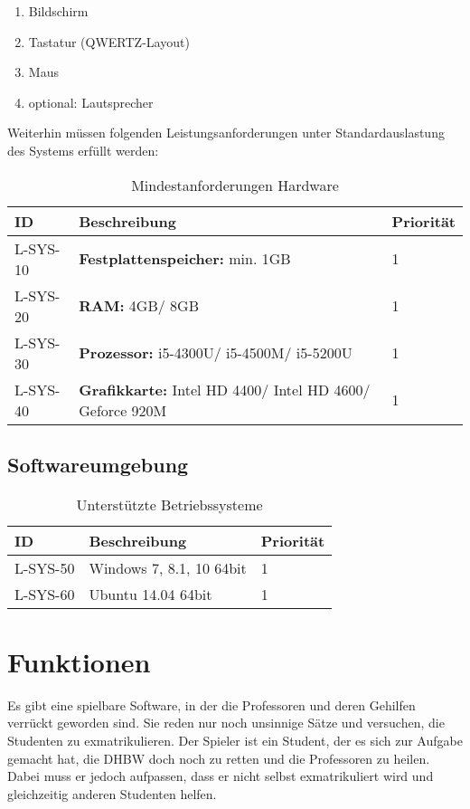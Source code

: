 \begin{enumerate}
	\item Bildschirm
	\item Tastatur (QWERTZ-Layout)
	\item Maus
	\item optional: Lautsprecher
\end{enumerate}

Weiterhin müssen folgenden Leistungsanforderungen unter Standardauslastung des Systems erfüllt werden:
\begin{table}[H]
\caption{Mindestanforderungen Hardware}
\label{hardware:mindestanforderungen}
\begin{tabularx}{\textwidth}{|l|X|l|}
\toprule
\textbf{ID} & \textbf{Beschreibung} & \textbf{Priorität}\\
\endhead
\hline
L-SYS-10 &  \textbf{Festplattenspeicher:} min. 1GB  & 1\\
L-SYS-20 & \textbf{RAM:} 4GB/ 8GB & 1\\
L-SYS-30 & \textbf{Prozessor:} i5-4300U/ i5-4500M/ 
 i5-5200U & 1\\
L-SYS-40 & \textbf{Grafikkarte:} Intel HD 4400/ Intel HD 4600/ Geforce 920M & 1\\
\hline
\end{tabularx}
\end{table}


\section{Softwareumgebung}
\begin{table}[H]
\caption{Unterstützte Betriebssysteme}
\label{hardware:systeme}
\begin{tabularx}{\textwidth}{|l|X|l|}
\toprule
\textbf{ID} & \textbf{Beschreibung} & \textbf{Priorität}\\
\endhead
\hline
L-SYS-50 & Windows 7, 8.1, 10 64bit & 1\\
\hline
L-SYS-60 & Ubuntu 14.04 64bit & 1\\
\hline
\end{tabularx}
\end{table}

\chapter{Funktionen}
Es gibt eine spielbare Software, in der die Professoren und deren Gehilfen verrückt geworden sind.
Sie reden nur noch unsinnige Sätze und versuchen, die Studenten zu exmatrikulieren. Der Spieler ist ein Student, der es sich zur Aufgabe gemacht hat, die DHBW doch noch zu retten und die Professoren zu heilen. Dabei muss er jedoch aufpassen, dass er nicht selbst exmatrikuliert wird und gleichzeitig anderen Studenten helfen.


